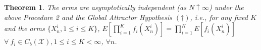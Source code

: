 \documentclass[12pt]{article}
\newtheorem{theorem}{Theorem}[section]
\numberwithin{equation}{section}
\newcommand{\PA}{\mathcal{P}}
\newcommand{\1}{\textbf{1}}
\newcommand{\X}{\mathcal{X}}
\begin{document}
%
%




\begin{theorem}\label{indep} The arms are asymptotically independent (as $N\uparrow\infty$) under the above Procedure 2 and the Global Attractor Hypothesis \textbf{$(\dagger)$}, i.e., for any fixed $K$ and the arms $\{X^i_n, 1 \leq i \leq K \}$, $E\left[\prod_{i=1}^Kf_i(X^i_n)\right] = \prod_{i=1}^KE\left[f_i(X^i_n)\right]$ \ $\forall \ f_i\in C_b(\X), 1 \leq i \leq K < \infty$, $\forall n$.
\end{theorem}
\end{document}
